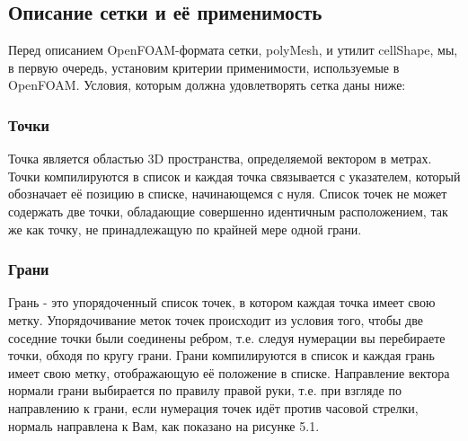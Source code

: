 \subsection{Описание сетки и её применимость}

Перед описанием OpenFOAM-формата сетки, polyMesh, и утилит cellShape, мы, в
первую очередь, установим критерии применимости, используемые в OpenFOAM.
Условия, которым должна удовлетворять сетка даны ниже:

\subsubsection{Точки}

Точка является областью 3D пространства, определяемой вектором в метрах. Точки
компилируются в список и каждая точка связывается с указателем, который обозначает её
 позицию в списке, начинающемся с нуля. Список точек не может содержать
две точки, обладающие совершенно идентичным расположением, так же как точку,
не принадлежащую по крайней мере одной грани.

\subsubsection{Грани}

Грань - это упорядоченный список точек, в котором каждая точка имеет свою метку.
Упорядочивание меток точек происходит из условия того, чтобы две соседние точки
 были соединены ребром, т.е. следуя нумерации вы перебираете точки, обходя по
кругу грани. Грани компилируются в список и каждая грань имеет свою метку, отображающую
 её положение в списке. Направление вектора нормали грани выбирается
по правилу правой руки, т.е. при взгляде по направлению к грани, если нумерация
точек идёт против часовой стрелки, нормаль направлена к Вам, как показано на
рисунке 5.1.

